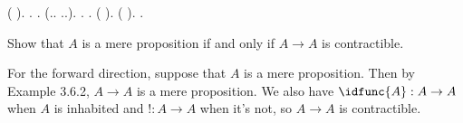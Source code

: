 \begin{coqdoccode}
\coqdocindent{1.00em}
 (\coqdocnotation{(}     \coqdocnotation{=} \coqdocnotation{(}    ).\coqdoceol
\coqdocindent{1.00em}
 . .\coqdoceol
\coqdocindent{1.00em}
 (.. \coqdocnotation{=} ..).  . \coqdoctac{\ensuremath{\exists}} .  ( ).\coqdoceol
\coqdocindent{1.00em}
 (\coqdocnotation{(} \coqdocnotation{(}    ).\coqdoceol
\coqdocnoindent
{}.\coqdoceol
\coqdocemptyline
\end{coqdoccode}
Show that $A$ is a mere proposition if and only if $A \to A$ is contractible.


 \soln 
For the forward direction, suppose that $A$ is a mere proposition.  Then by
Example 3.6.2, $A \to A$ is a mere proposition.  We also have $\idfunc{A} : A
\to A$ when $A$ is inhabited and $! : A \to A$ when it's not, so $A \to A$ is
contractible.


